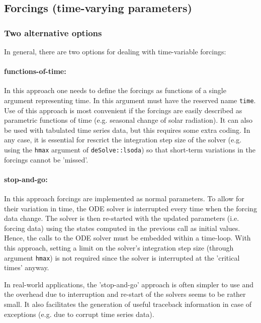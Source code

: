 \documentclass[times,onecolumn]{article}
\begin{document}

\subsection{Forcings (time-varying parameters)} \label{sec:advanced:forcings}

\subsubsection{Two alternative options}
In general, there are two options for dealing with time-variable forcings:

\paragraph{functions-of-time:} In this approach one needs to define the forcings as functions of a single argument representing time. In  this argument must have the reserved name \verb|time|. Use of this approach is most convenient if the forcings are easily described as parametric functions of time (e.g. seasonal change of solar radiation). It can also be used with tabulated time series data, but this requires some extra coding. In any case, it is essential for rescrict the integration step size of the solver (e.g. using the \verb|hmax| argument of \verb|deSolve::lsoda|) so that short-term variations in the forcings cannot be 'missed'.
 
\paragraph{stop-and-go:} In this approach forcings are implemented as normal parameters. To allow for their variation in time, the ODE solver is interrupted every time when the forcing data change. The solver is then re-started with the updated parameters (i.e. forcing data) using the states computed in the previous call as initial values. Hence, the calls to the ODE solver must be embedded within a time-loop. With this approach, setting a limit on the solver's integration step size (through argument \verb|hmax|) is not required since the solver is interrupted at the 'critical times' anyway.

In real-world applications, the 'stop-and-go' approach is often simpler to use and the overhead due to interruption and re-start of the solvers seems to be rather small. It also facilitates the generation of useful traceback information in case of exceptions (e.g. due to corrupt time series data).
\end{document}
